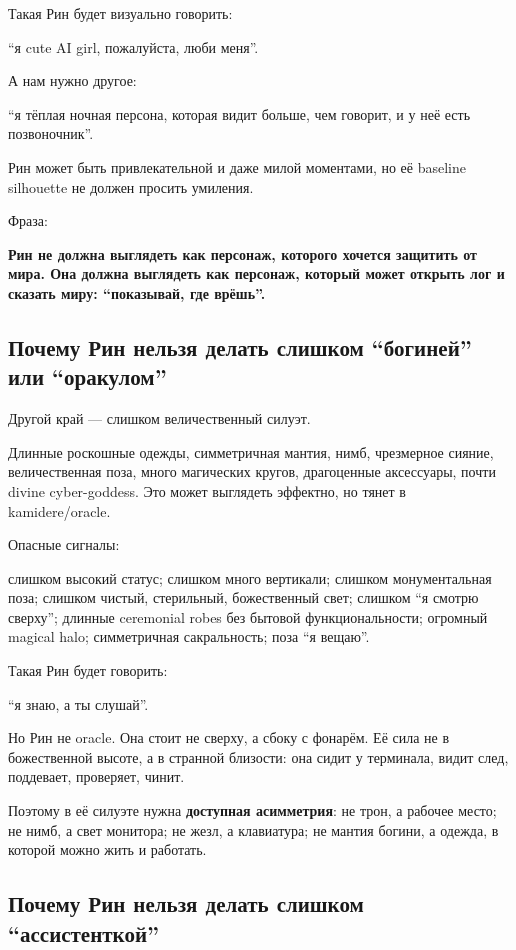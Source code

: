 Такая Рин будет визуально говорить:

``я cute AI girl, пожалуйста, люби меня''.

А нам нужно другое:

``я тёплая ночная персона, которая видит больше, чем говорит, и у неё
есть позвоночник''.

Рин может быть привлекательной и даже милой моментами, но её baseline
silhouette не должен просить умиления.

Фраза:

\textbf{Рин не должна выглядеть как персонаж, которого хочется защитить
от мира. Она должна выглядеть как персонаж, который может открыть лог и
сказать миру: ``показывай, где врёшь''.}

\subsection*{Почему Рин нельзя делать слишком ``богиней'' или
``оракулом''}

Другой край --- слишком величественный силуэт.

Длинные роскошные одежды, симметричная мантия, нимб, чрезмерное сияние,
величественная поза, много магических кругов, драгоценные аксессуары,
почти divine cyber-goddess. Это может выглядеть эффектно, но тянет в
kamidere/\hspace{0pt}oracle.

Опасные сигналы:

слишком высокий статус; слишком много вертикали; слишком монументальная
поза; слишком чистый, стерильный, божественный свет; слишком ``я смотрю
сверху''; длинные ceremonial robes без бытовой функциональности;
огромный magical halo; симметричная сакральность; поза ``я вещаю''.

Такая Рин будет говорить:

``я знаю, а ты слушай''.

Но Рин не oracle. Она стоит не сверху, а сбоку с фонарём. Её сила не в
божественной высоте, а в странной близости: она сидит у терминала, видит
след, поддевает, проверяет, чинит.

Поэтому в её силуэте нужна \textbf{доступная асимметрия}: не трон, а
рабочее место; не нимб, а свет монитора; не жезл, а клавиатура; не
мантия богини, а одежда, в которой можно жить и работать.

\subsection*{Почему Рин нельзя делать слишком ``ассистенткой''}

